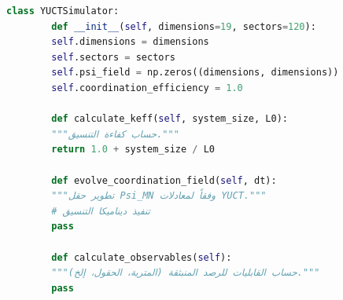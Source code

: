 \documentclass[11pt,a4paper]{article}
\theoremstyle{remark}
\begin{document}
	\begin{lstlisting}[language=Python, caption={إطار محاكاة YUCT}, label={lst:simulation}]
		class YUCTSimulator:
		def __init__(self, dimensions=19, sectors=120):
		self.dimensions = dimensions
		self.sectors = sectors
		self.psi_field = np.zeros((dimensions, dimensions))
		self.coordination_efficiency = 1.0
		
		def calculate_keff(self, system_size, L0):
		"""حساب كفاءة التنسيق."""
		return 1.0 + system_size / L0
		
		def evolve_coordination_field(self, dt):
		"""تطوير حقل Psi_MN وفقاً لمعادلات YUCT."""
		# تنفيذ ديناميكا التنسيق
		pass
		
		def calculate_observables(self):
		"""حساب القابليات للرصد المنبثقة (المترية، الحقول، إلخ)."""
		pass
	\end{lstlisting}
	
\end{document}
